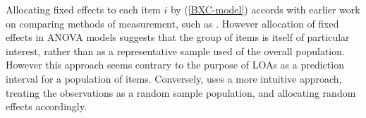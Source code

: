 \documentclass[12pt, a4paper]{report}
\theoremstyle{plain}
\theoremstyle{definition}
\theoremstyle{remark}
\begin{document}
Allocating fixed effects to each item $i$ by (\ref{BXC-model}) accords with earlier work on comparing methods of measurement, such as \citet{Grubbs48}. However allocation of fixed effects in ANOVA models suggests that the group of items is itself of particular interest, rather than as a representative sample used of the overall population. However this approach seems contrary to the purpose of LOAs as a prediction interval for a population of items. Conversely, \citet{ARoy2009} uses a more intuitive approach, treating the observations as a random sample population, and allocating random effects accordingly.
	
	
%	
%	
%	
%	
%	
%	
%	
%	
%	
%	
	
\end{document}
